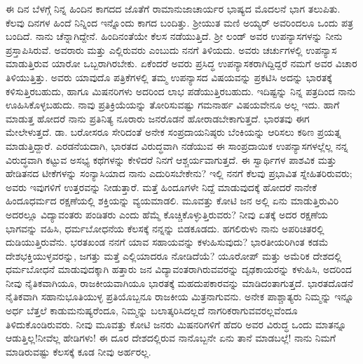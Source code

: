 ಈ ದಿನ ಬೆಳಗ್ಗೆ ನಿನ್ನ ಹಿಂದಿನ ಕಾಗದದ ಜೊತೆಗೆ ರಾಮಾನುಜಾಚಾರ್ಯರ ಭಾಷ್ಯದ ಮೊದಲನೆ ಭಾಗ ತಲುಪಿತು. ಕೆಲವು ದಿನಗಳ ಹಿಂದೆ ನಿನ್ನಿಂದ ಇನ್ನೊಂದು ಕಾಗದ ಬಂದಿತ್ತು. ಶ‍್ರೀಯುತ ಮಣಿ ಅಯ್ಯರ್ ಅವರಿಂದಲೂ ಒಂದು ಪತ್ರ ಬಂದಿದೆ. ನಾನು ಚೆನ್ನಾಗಿದ್ದೇನೆ. ಹಿಂದಿನಂತೆಯೇ ಕೆಲಸ ನಡೆಯುತ್ತಿದೆ. ಶ‍್ರೀ ಲಂಡ್ ಅವರ ಉಪನ್ಯಾಸಗಳನ್ನು ನೀನು ಪ್ರಸ್ತಾಪಿಸಿರುವೆ. ಅವರಾರು ಮತ್ತು ಎಲ್ಲಿರುವರು ಎಂಬುದು ನನಗೆ ತಿಳಿಯದು. ಅವರು ಚರ್ಚುಗಳಲ್ಲಿ ಉಪನ್ಯಾಸ ಮಾಡುತ್ತಿರುವ ಯಾರೋ ಒಬ್ಬರಾಗಿರಬೇಕು. ಏಕೆಂದರೆ ಅವರು ಪ್ರಸಿದ್ಧ ಉಪನ್ಯಾಸಕರಾಗಿದ್ದಿದ್ದರೆ ನಮಗೆ ಅವರ ವಿಚಾರ ತಿಳಿಯುತ್ತಿತ್ತು. ಅವರು ಯಾವುದೊ ಪತ್ರಿಕೆಗಳಲ್ಲಿ ತಮ್ಮ ಉಪನ್ಯಾಸದ ವಿಷಯವನ್ನು ಪ್ರಕಟಿಸಿ ಅದನ್ನು ಭಾರತಕ್ಕೆ ಕಳಿಸುತ್ತಿರಬಹುದು, ಹಾಗೂ ಮಿಷನರಿಗಳು ಅದರಿಂದ ಲಾಭ ಪಡೆಯುತ್ತಿರಬಹುದು. ಇದಿಷ್ಟನ್ನು ನಿನ್ನ ಪತ್ರದಿಂದ ನಾನು ಊಹಿಸಿಕೊಳ್ಳಬಹುದು. ನಾವು ಪ್ರತಿಕ್ರಿಯೆಯನ್ನು ತೋರಿಸುವಷ್ಟು ಗಮನಾರ್ಹ ವಿಷಯವೇನೂ ಅಲ್ಲ ಇದು. ಹಾಗೆ ಮಾಡುತ್ತ ಹೋದರೆ ನಾನು ಪ್ರತಿನಿತ್ಯ ನೂರಾರು ಜನರೊಡನೆ ಹೋರಾಡಬೇಕಾಗುತ್ತದೆ. ಭಾರತವು ಈಗ ಮೇಲೇಳುತ್ತದೆ. ಡಾ. ಬರೋಸರೂ ಸೇರಿದಂತೆ ಅನೇಕ ಸಂಪ್ರದಾಯನಿಷ್ಠರು ಬೆಂಕಿಯನ್ನು ಆರಿಸಲು ಕಠಿಣ ಪ್ರಯತ್ನ ಮಾಡುತ್ತಿದ್ದಾರೆ. ಎರಡನೆಯದಾಗಿ, ಭಾರತದ ವಿರುದ್ಧವಾಗಿ ನಡೆಯುವ ಈ ಸಾಂಪ್ರದಾಯಿಕ ಉಪನ್ಯಾಸಗಳಲ್ಲೆಲ್ಲ ನನ್ನ ವಿರುದ್ಧವಾಗಿ ಕಟ್ಟುವ ಅಸಭ್ಯ ಕಥೆಗಳನ್ನು ಕೇಳಿದರೆ ನಿನಗೆ ಆಶ್ಚರ್ಯವಾಗುತ್ತದೆ. ಈ ಸ್ವಾರ್ಥಿಗಳ ಪಾಶವಿಕ ಮತ್ತು ಹೇಡಿತನದ ಟೀಕೆಗಳನ್ನು ಸಂನ್ಯಾಸಿಯಾದ ನಾನು ಎದುರಿಸಬೇಕೇನು? ಇಲ್ಲಿ ನನಗೆ ಕೆಲವು ಪ್ರಭಾವಿತ ಸ್ನೇಹಿತರಿರುವರು; ಅವರು ಇವುಗಳಿಗೆ ಉತ್ತರವನ್ನು ನೀಡುತ್ತಾರೆ. ಮತ್ತೆ ಹಿಂದೂಗಳೇ ನಿದ್ದೆ ಮಾಡುವುದಕ್ಕೆ ಹೋದರೆ ನಾನೇಕೆ ಹಿಂದೂಧರ್ಮದ ರಕ್ಷಣೆಯಲ್ಲಿ ಶಕ್ತಿಯನ್ನು ವ್ಯಯಮಾಡಲಿ. ಮೂವತ್ತು ಕೋಟಿ ಜನ ಅಲ್ಲಿ ಏನು ಮಾಡುತ್ತಿರುವಿರಿ\enginline{-} ಅದರಲ್ಲೂ ವಿದ್ಯಾವಂತರು ಪಂಡಿತರು ಎಂದು ಹೆಮ್ಮೆ ಕೊಚ್ಚಿಕೊಳ್ಳುತ್ತಿರುವರು? ನೀವು ಏತಕ್ಕೆ ಅದರ ರಕ್ಷಣೆಯ ಭಾಗವನ್ನು ವಹಿಸಿ, ಧರ್ಮಬೋಧನೆಯ ಕೆಲಸಕ್ಕೆ ನನ್ನನ್ನು ಬಿಡಕೂಡದು. ಹಗಲಿರುಳು ನಾನು ಅಪರಿಚಿತರಲ್ಲಿ ದುಡಿಯುತ್ತಿರುವೆನು. ಭರತಖಂಡ ನನಗೆ ಯಾವ ಸಹಾಯವನ್ನು ಕಳುಹಿಸುವುದು? ಭಾರತೀಯರಿಗಿಂತ ಕಡಮೆ ದೇಶಭಕ್ತಿಯುಳ್ಳವರನ್ನು, ಜಗತ್ತು ಮತ್ತೆ ಎಲ್ಲಿಯಾದರೂ ನೋಡಿದೆಯೆ? ಯೂರೋಪ್ ಮತ್ತು ಅಮೆರಿಕ ದೇಶದಲ್ಲಿ ಧರ್ಮಬೋಧನೆ ಮಾಡುವುದಕ್ಕಾಗಿ ಹತ್ತಾರು ಜನ ವಿದ್ಯಾವಂತರಾಗಿರುವವರನ್ನು ದೃಢಕಾಯರನ್ನು ಕಳುಹಿಸಿ, ಅದರಿಂದ ನೀವು ನೈತಿಕವಾಗಿಯೂ, ರಾಜಕೀಯವಾಗಿಯೂ ಭಾರತಕ್ಕೆ ಮಹದುಪಕಾರವನ್ನು ಮಾಡಿದಂತಾಗುತ್ತದೆ. ಭಾರತದೊಡನೆ ನೈತಿಕವಾಗಿ ಸಹಾನುಭೂತಿಯುಳ್ಳ ಪ್ರತಿಯೊಬ್ಬನೂ ರಾಜಕೀಯ ಮಿತ್ರನಾಗುವನು. ಅನೇಕ ಪಾಶ್ಚಾತ್ಯರು ನಿಮ್ಮನ್ನು ಇನ್ನೂ ಅರ್ಧ ಬೆತ್ತಲೆ ಕಾಡುಮನುಷ್ಯರೆಂದೂ, ನಿಮ್ಮನ್ನು ಬಲಾತ್ಕರಿಸಿದಲ್ಲದೆ ನಾಗರಿಕರಾಗುವವರಲ್ಲವೆಂದೂ ತಿಳಿದುಕೊಂಡಿರುವರು. ನೀವು ಮೂವತ್ತು ಕೋಟಿ ಜನರು ಮಿಷನರಿಗಳಿಗೆ ಹೆದರಿ ಅವರ ವಿರುದ್ಧ ಒಂದು ಮಾತನ್ನೂ ಆಡುತ್ತಿಲ್ಲ!ನೀವೆಲ್ಲ ಹೇಡಿಗಳು! ಈ ದೂರ ದೇಶದಲ್ಲಿರುವ ನಾನೊಬ್ಬನೇ ಏನು ತಾನೆ ಮಾಡಬಲ್ಲೆ! ನಾನು ನಿಮಗೆ ಮಾಡಿರುವಷ್ಟು ಕೆಲಸಕ್ಕೆ ಕೂಡ ನೀವು ಅರ್ಹರಲ್ಲ.

